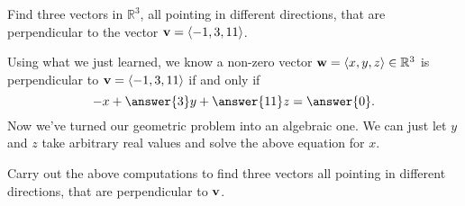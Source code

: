 \documentclass{ximera}
\begin{document}
\begin{question}  \label{Qgsdfbe34:Scalar}
Find three vectors in $\mathbb{R}^3$, all pointing in different directions, that are perpendicular to the vector ${\bf v}= \langle -1,3,11\rangle$. 

\begin{explanation}
Using what we just learned, we know a non-zero vector ${\bf w} = \langle x, y, z \rangle \in \mathbb{R}^3$ is perpendicular to ${\bf v} = \langle -1,3,11\rangle$ if and only if
\[
     -x + \answer{3}y + \answer{11}z = \answer{0}.
\]
Now we've turned our geometric problem into an algebraic one. We can just let $y$ and $z$ take arbitrary real values and solve the above equation for $x$. 
\begin{freeResponse}
Carry out the above computations to find three vectors all pointing in different directions, that are perpendicular to ${\bf v}$.
\end{freeResponse}


\end{explanation}
\end{question}



\begin{question} \label{Qdf6:Scalar}
 
\begin{onlineOnly}
    \begin{center}
\end{center}
\end{onlineOnly}


\end{question}
\end{document}
